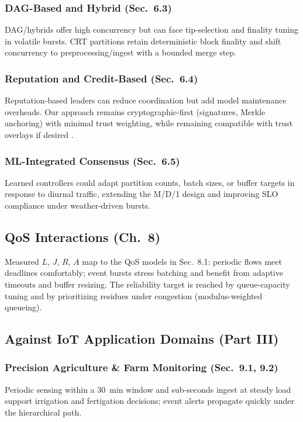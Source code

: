 \subsubsection{DAG-Based and Hybrid (Sec.~6.3)}
DAG/hybrids offer high concurrency but can face tip-selection and finality tuning in volatile bursts. CRT partitions retain deterministic block finality and shift concurrency to preprocessing/ingest with a bounded merge step.

\subsubsection{Reputation and Credit-Based (Sec.~6.4)}
Reputation-based leaders can reduce coordination but add model maintenance overheads. Our approach remains cryptographic-first (signatures, Merkle anchoring) with minimal trust weighting, while remaining compatible with trust overlays if desired \cite{morais2023surveyonintegration}.

\subsubsection{ML-Integrated Consensus (Sec.~6.5)}
Learned controllers could adapt partition counts, batch sizes, or buffer targets in response to diurnal traffic, extending the M/D/1 design and improving SLO compliance under weather-driven bursts. %

\subsection{QoS Interactions (Ch.~8)}
Measured $L$, $J$, $R$, $A$ map to the QoS models in Sec.~8.1: periodic flows meet deadlines comfortably; event bursts stress batching and benefit from adaptive timeouts and buffer resizing. The reliability target is reached by queue-capacity tuning and by prioritizing residues under congestion (modulus-weighted queueing).

\subsection{Against IoT Application Domains (Part III)}
\subsubsection{Precision Agriculture \& Farm Monitoring (Sec.~9.1, 9.2)}
Periodic sensing within a 30~min window and sub-seconds ingest at steady load support irrigation and fertigation decisions; event alerts propagate quickly under the hierarchical path.

